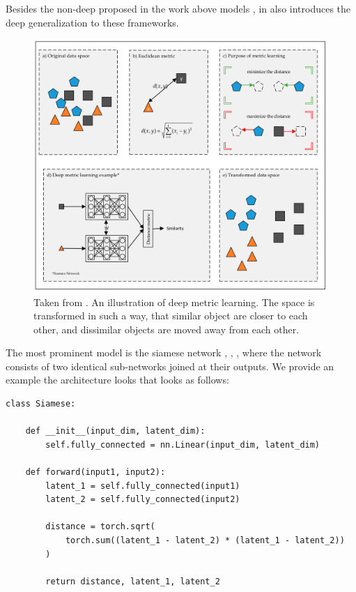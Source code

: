 \documentclass[a4paper,12pt,twoside,openright]{report}
\begin{document}
Besides the non-deep proposed in the work above models , in\cite{kaya19} also introduces the deep generalization to these frameworks.

\begin{figure}[H]
	\center
  \includegraphics[width=\linewidth]{./assets/relatedwork/metric_learning.png}
  \caption{Taken from \cite{kaya19}. An illustration of deep metric learning. The space is transformed in such a way, that similar object are closer to each other, and dissimilar objects are moved away from each other.}
  \label{fig:muse_translation}
\end{figure}

The most prominent model is the siamese network \cite{bromley94}, \cite{chopra05}, \cite{hadsell06}, where the network consists of two identical sub-networks joined at their outputs. 
We provide an example the architecture looks that looks as follows:

\begin{verbatim}
class Siamese:

    def __init__(input_dim, latent_dim):
        self.fully_connected = nn.Linear(input_dim, latent_dim)
        
    def forward(input1, input2):
        latent_1 = self.fully_connected(input1)
        latent_2 = self.fully_connected(input2)
        
        distance = torch.sqrt(
            torch.sum((latent_1 - latent_2) * (latent_1 - latent_2))
        )
        
        return distance, latent_1, latent_2
\end{verbatim}
\end{document}
